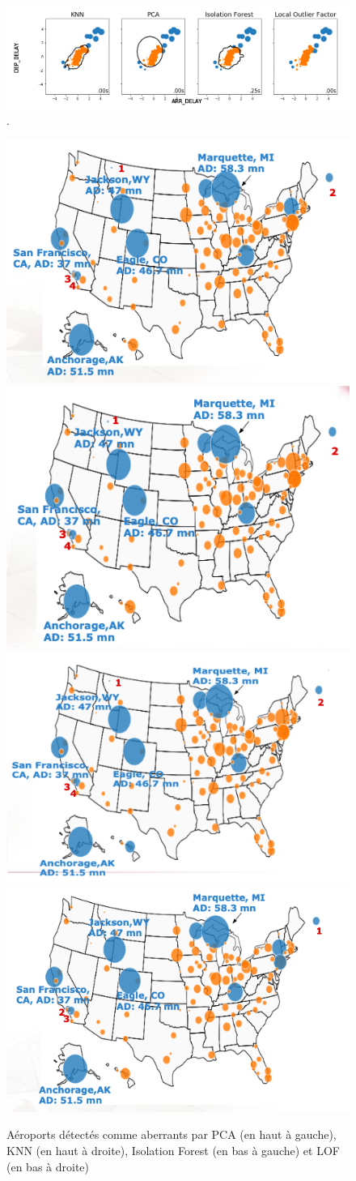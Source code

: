 \begin{figure}[ht]
    \centering
     \includegraphics[width=1\textwidth]{ADOA/Images/Vol_results.png}\label{fig02}.
    \caption{Aéroports détectés comme aberrants par PCA, KNN, Isolation Forest et LOF.}%
    \includegraphics[width=.45\textwidth]{ADOA/Images/Vol_PCA.png}
    \includegraphics[width=.450\textwidth]{ADOA/Images/Vol_KNN.png}\\
    \includegraphics[width=.45\textwidth]{ADOA/Images/Vol_IsoForest.png}
    \includegraphics[width=.450\textwidth]{ADOA/Images/Vol_LOF.png}
    \caption{Aéroports détectés comme aberrants par PCA (en haut à gauche), KNN (en haut à droite), Isolation Forest (en bas à gauche) et LOF (en bas à droite)}%
    \label{fig21}
\end{figure}

